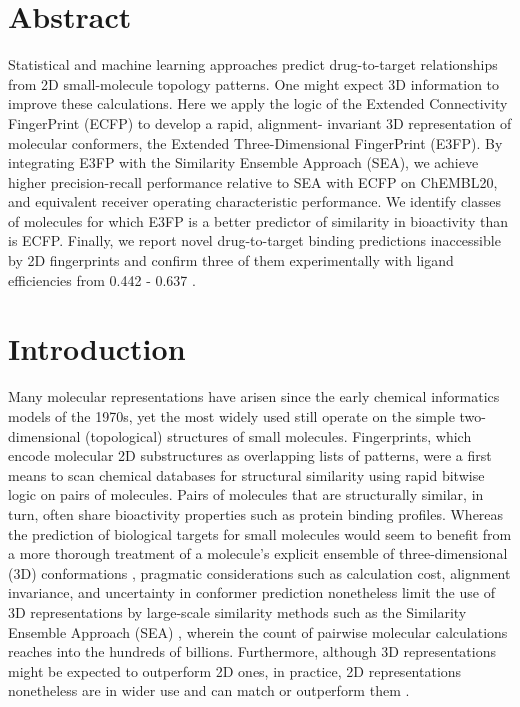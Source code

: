 \documentclass[../main.tex]{subfiles}
\begin{document}
\begin{refsection}

\section{Abstract}

Statistical and machine learning approaches predict drug-to-target relationships from 2D small-molecule topology patterns.
One might expect 3D information to improve these calculations.
Here we apply the logic of the Extended Connectivity FingerPrint (ECFP) to develop a rapid, alignment- invariant 3D representation of molecular conformers, the Extended Three-Dimensional FingerPrint (E3FP).
By integrating E3FP with the Similarity Ensemble Approach (SEA), we achieve higher precision-recall performance relative to SEA with ECFP on ChEMBL20, and equivalent receiver operating characteristic performance.
We identify classes of molecules for which E3FP is a better predictor of similarity in bioactivity than is ECFP.
Finally, we report novel drug-to-target binding predictions inaccessible by 2D fingerprints and confirm three of them experimentally with ligand efficiencies from 0.442 - 0.637 \LEunit{}.

\section{Introduction}

Many molecular representations have arisen since the early chemical informatics models of the 1970s, yet the most widely used still operate on the simple two-dimensional (topological) structures of small molecules.
Fingerprints, which encode molecular 2D substructures as overlapping lists of patterns, were a first means to scan chemical databases for structural similarity using rapid bitwise logic on pairs of molecules.
Pairs of molecules that are structurally similar, in turn, often share bioactivity properties \cite{matter_1997} such as protein binding profiles.
Whereas the prediction of biological targets for small molecules would seem to benefit from a more thorough treatment of a molecule's explicit ensemble of three-dimensional (3D) conformations \cite{nicholls_2010}, pragmatic considerations such as calculation cost, alignment invariance, and uncertainty in conformer prediction \cite{sheridan_2002} nonetheless limit the use of 3D representations by large-scale similarity methods such as the Similarity Ensemble Approach (SEA) \cite{keiser_2007,keiser_2009}, wherein the count of pairwise molecular calculations reaches into the hundreds of billions.
Furthermore, although 3D representations might be expected to outperform 2D ones, in practice, 2D representations nonetheless are in wider use and can match or outperform them \cite{sheridan_2002,hert_2008,maggiora_2014,keiser_2010}.


\end{refsection}
\end{document}
